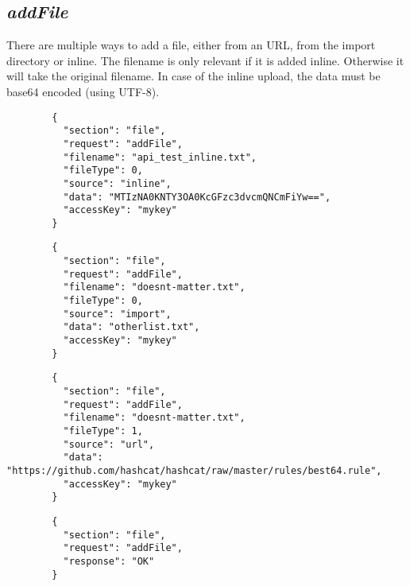 \subsection*{\textit{addFile}}
	There are multiple ways to add a file, either from an URL, from the import directory or inline. The filename is only relevant if it is added inline. Otherwise it will take the original filename. In case of the inline upload, the data must be base64 encoded (using UTF-8).
	{
		\color{blue}
		\begin{verbatim}
		{
		  "section": "file",
		  "request": "addFile",
		  "filename": "api_test_inline.txt",
		  "fileType": 0,
		  "source": "inline",
		  "data": "MTIzNA0KNTY3OA0KcGFzc3dvcmQNCmFiYw==",
		  "accessKey": "mykey"
		}
		\end{verbatim}
	}
	{
		\color{blue}
		\begin{verbatim}
		{
		  "section": "file",
		  "request": "addFile",
		  "filename": "doesnt-matter.txt",
		  "fileType": 0,
		  "source": "import",
		  "data": "otherlist.txt",
		  "accessKey": "mykey"
		}
		\end{verbatim}
	}
	{
		\color{blue}
		\begin{verbatim}
		{
		  "section": "file",
		  "request": "addFile",
		  "filename": "doesnt-matter.txt",
		  "fileType": 1,
		  "source": "url",
		  "data": "https://github.com/hashcat/hashcat/raw/master/rules/best64.rule",
		  "accessKey": "mykey"
		}
		\end{verbatim}
	}
	{
		\color{OliveGreen}
		\begin{verbatim}
		{
		  "section": "file",
		  "request": "addFile",
		  "response": "OK"
		}
		\end{verbatim}
	}








